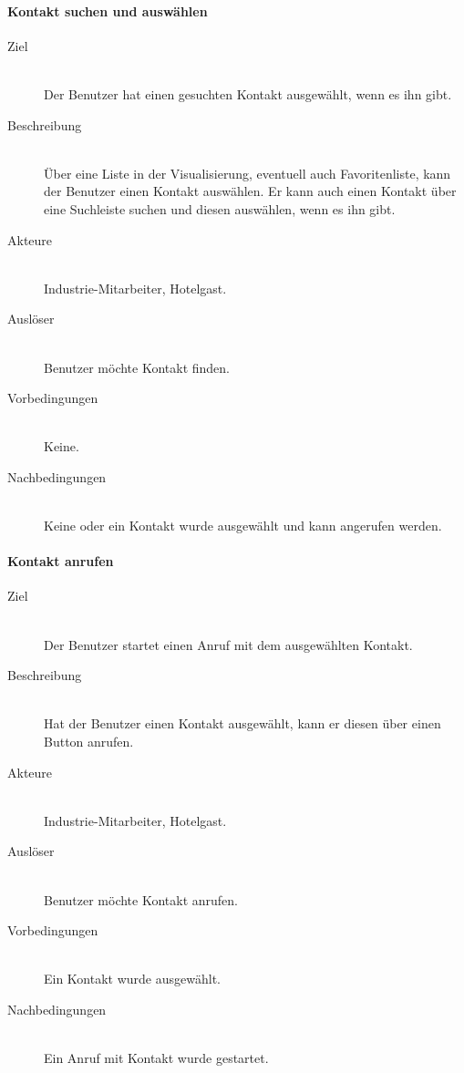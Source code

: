 \paragraph{Kontakt suchen und auswählen}
    \begin{description}
        \item[Ziel]\hfill \\
        Der Benutzer hat einen gesuchten Kontakt ausgewählt, wenn es ihn gibt.
        \item[Beschreibung]\hfill \\
        Über eine Liste in der Visualisierung, eventuell auch Favoritenliste, kann der Benutzer einen Kontakt auswählen.
        Er kann auch einen Kontakt über eine Suchleiste suchen und diesen auswählen, wenn es ihn gibt.
        \item[Akteure]\hfill \\
        Industrie-Mitarbeiter, Hotelgast.
        \item[Auslöser]\hfill \\
        Benutzer möchte Kontakt finden.
        \item[Vorbedingungen]\hfill \\
        Keine.
        \item[Nachbedingungen]\hfill \\
        Keine oder ein Kontakt wurde ausgewählt und kann angerufen werden.
        \end{description}

\paragraph{Kontakt anrufen}
    \begin{description}
        \item[Ziel]\hfill \\
        Der Benutzer startet einen Anruf mit dem ausgewählten Kontakt.
        \item[Beschreibung]\hfill \\
        Hat der Benutzer einen Kontakt ausgewählt, kann er diesen über einen Button anrufen.
        \item[Akteure]\hfill \\
        Industrie-Mitarbeiter, Hotelgast.
        \item[Auslöser]\hfill \\
        Benutzer möchte Kontakt anrufen.
        \item[Vorbedingungen]\hfill \\
        Ein Kontakt wurde ausgewählt.
        \item[Nachbedingungen]\hfill \\
        Ein Anruf mit Kontakt wurde gestartet.
        \end{description}

